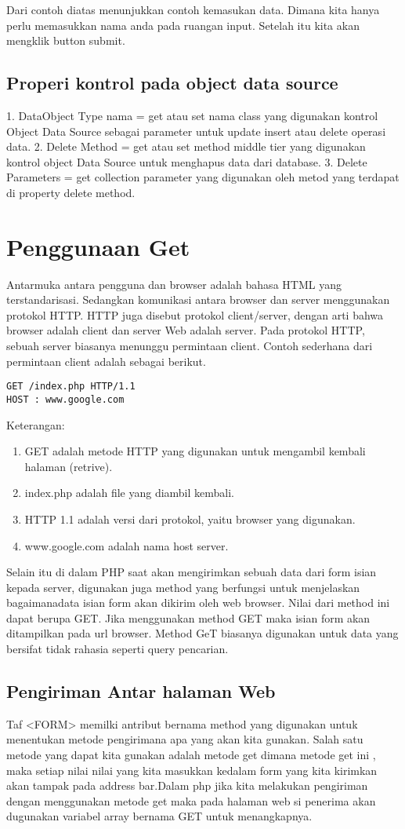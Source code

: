 Dari contoh diatas menunjukkan contoh kemasukan data. Dimana kita hanya perlu memasukkan nama anda pada ruangan input. Setelah itu kita 
akan mengklik button submit.

\subsection{Properi kontrol pada object data source}
1.	DataObject Type nama = get atau set nama class yang digunakan kontrol Object Data Source sebagai parameter untuk update insert atau 
delete operasi data.
2.	Delete Method = get atau set method middle tier yang digunakan kontrol object Data Source untuk menghapus data dari database.
3.	Delete Parameters = get collection parameter yang digunakan oleh metod yang terdapat di property delete method.

\section{Penggunaan Get}
Antarmuka antara pengguna dan browser adalah bahasa HTML yang terstandarisasi. Sedangkan komunikasi antara browser dan server 
menggunakan protokol HTTP. HTTP juga disebut protokol client/server, dengan arti bahwa browser adalah client dan server Web adalah 
server. Pada protokol HTTP, sebuah server biasanya menunggu permintaan client. 
Contoh sederhana dari permintaan client adalah sebagai berikut.
\begin{verbatim}
GET /index.php HTTP/1.1
HOST : www.google.com
\end{verbatim}
Keterangan:
\begin{enumerate}
\item GET adalah metode HTTP yang digunakan untuk mengambil kembali halaman (retrive).
\item index.php adalah file yang diambil kembali.
\item HTTP 1.1 adalah versi dari protokol, yaitu browser yang digunakan.
\item www.google.com adalah nama host server.
\end{enumerate}
Selain itu di dalam PHP saat akan mengirimkan sebuah data dari form isian kepada server, digunakan juga method yang berfungsi untuk 
menjelaskan bagaimanadata isian form akan dikirim oleh web browser. Nilai dari method ini dapat berupa GET. 
Jika menggunakan method GET maka isian form akan ditampilkan pada url browser. Method GeT biasanya digunakan untuk data yang bersifat 
tidak rahasia seperti query pencarian. 

\subsection{Pengiriman Antar halaman Web}
Taf <FORM> memilki antribut bernama method yang digunakan untuk menentukan metode pengirimana apa yang akan kita gunakan. Salah satu 
metode yang dapat kita gunakan adalah metode get dimana metode get ini , maka setiap nilai nilai yang kita masukkan kedalam form yang 
kita kirimkan akan tampak pada address bar.Dalam php jika kita melakukan pengiriman dengan menggunakan metode get maka pada halaman web 
si penerima akan dugunakan variabel array bernama GET untuk menangkapnya.

